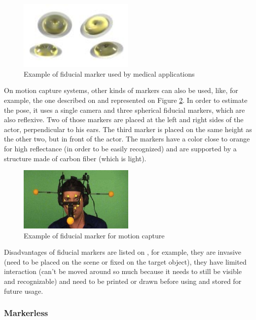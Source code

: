 \documentclass[msc, a4paper, classic, en]{ufbathesis}
\begin{document}
\begin{figure}
\label{fig:sticker}
\centering
\includegraphics[width=0.5\textwidth]{images/sticker.png}
\caption{Example of fiducial marker used by medical applications}
\end{figure}

On motion capture systems, other kinds of markers can also be used, like, for example, the one described on \cite{24} and represented on Figure \ref{fig:helmet}. In order to estimate the pose, it uses a single camera and three spherical fiducial markers, which are also reflexive. Two of those markers are placed at the left and right sides of the actor, perpendicular to his ears. The third marker is placed on the same height as the other two, but in front of the actor. The markers have a color close to orange for high reflectance (in order to be easily recognized) and are supported by a structure made of carbon fiber (which is light).

\begin{figure}
\label{fig:helmet}
\centering
\includegraphics[width=0.5\textwidth]{images/helmet.png}
\caption{Example of fiducial marker for motion capture}
\end{figure}

Disadvantages of fiducial markers are listed on \cite{39}, for example, they are invasive (need to be placed on the scene or fixed on the target object), they have limited interaction (can't be moved around so much because it needs to still be visible and recognizable) and need to be printed or drawn before using and stored for future usage.

\subsubsection{Markerless}
\end{document}
